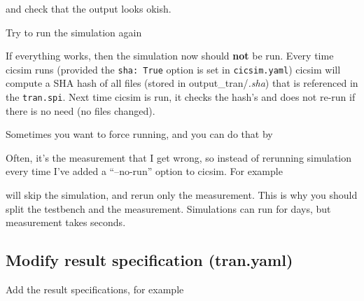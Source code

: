 and check that the output looks okish.

Try to run the simulation again

\begin{Shaded}
\begin{Highlighting}[]
\end{Highlighting}
\end{Shaded}

If everything works, then the simulation now should \textbf{not} be run.
Every time cicsim runs (provided the \texttt{sha:\ True} option is set
in \texttt{cicsim.yaml}) cicsim will compute a SHA hash of all files
(stored in output\_tran/\emph{.sha}) that is referenced in the
\texttt{tran.spi}. Next time cicsim is run, it checks the hash's and
does not re-run if there is no need (no files changed).

Sometimes you want to force running, and you can do that by

\begin{Shaded}
\begin{Highlighting}[]
\end{Highlighting}
\end{Shaded}

Often, it's the measurement that I get wrong, so instead of rerunning
simulation every time I've added a ``--no-run'' option to cicsim. For
example

\begin{Shaded}
\begin{Highlighting}[]
\end{Highlighting}
\end{Shaded}

will skip the simulation, and rerun only the measurement. This is why
you should split the testbench and the measurement. Simulations can run
for days, but measurement takes seconds.

\subsection{Modify result specification
(tran.yaml)}\label{modify-result-specification-tran.yaml}

Add the result specifications, for example

